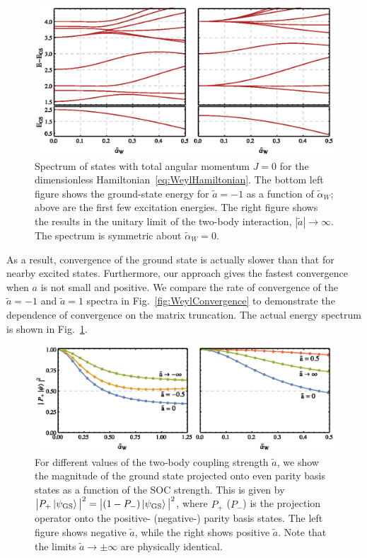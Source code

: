 \begin{figure}
\centering
\includegraphics{SOC/Figures/WeylSpectrum}
\caption[Spectrum of states with $J=0$ for Weyl spin-orbit coupling]{\label{fig:WeylSpectrum}  Spectrum of states with total angular momentum $J=0$ for the dimensionless Hamiltonian~\eqref{eq:WeylHamiltonian}. The bottom left figure shows the ground-state energy for $\tilde{a}=-1$ as a function of $\tilde{\alpha}_W$; above are the first few excitation energies. The right figure shows the results in the unitary limit of the two-body interaction, $|\tilde{a}|\rightarrow\infty$. The spectrum is symmetric about $\tilde{\alpha}_W=0$.} 
\end{figure}

As a result, convergence of the ground state is actually slower than that for nearby excited states. Furthermore, our approach gives the fastest convergence when $a$ is not small and positive. We compare the rate of convergence of the $\tilde{a}=-1$ and $\tilde{a}=1$ spectra in Fig.~\ref{fig:WeylConvergence} to demonstrate the dependence of convergence on the matrix truncation. The actual energy spectrum is shown in Fig.~\ref{fig:WeylSpectrum}. 

\begin{figure}
\centering
\includegraphics{SOC/Figures/Projections}
\caption[Parity projection of the Weyl spin-orbit coupling ground state]{\label{fig:Projections} For different values of the two-body coupling strength $\tilde{a}$, we show the magnitude of the ground state projected onto even parity basis states as a function of the SOC strength. This is given by $\big|  P_+\ket{\psi_{\text{GS}}}\big|^2=\big| (1- P_-)\ket{\psi_{\text{GS}}}\big|^2$, where $P_+$ ($P_-$) is the projection operator onto the positive\nobreak- (negative\nobreak-) parity basis states. The left figure shows negative $\tilde{a}$, while the right shows positive $\tilde{a}$. Note that the limits $\tilde{a}\rightarrow\pm\infty$ are physically identical.}
\end{figure}

